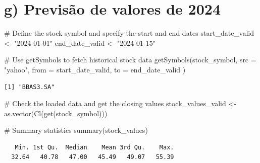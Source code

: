 \documentclass[
  letterpaper,
  DIV=11,
  numbers=noendperiod]{scrreprt}
\newenvironment{Shaded}{\begin{snugshade}}{\end{snugshade}}
\newcommand{\AttributeTok}[1]{\textcolor[rgb]{0.40,0.45,0.13}{#1}}
\newcommand{\CommentTok}[1]{\textcolor[rgb]{0.37,0.37,0.37}{#1}}
\newcommand{\FunctionTok}[1]{\textcolor[rgb]{0.28,0.35,0.67}{#1}}
\newcommand{\NormalTok}[1]{\textcolor[rgb]{0.00,0.23,0.31}{#1}}
\newcommand{\OtherTok}[1]{\textcolor[rgb]{0.00,0.23,0.31}{#1}}
\newcommand{\StringTok}[1]{\textcolor[rgb]{0.13,0.47,0.30}{#1}}
\begin{document}
\hypertarget{g-previsuxe3o-de-valores-de-2024}{%
\section*{g) Previsão de valores de
2024}\label{g-previsuxe3o-de-valores-de-2024}}


\begin{Shaded}
\begin{Highlighting}[]
\CommentTok{\# Define the stock symbol and specify the start and end dates}
\NormalTok{start\_date\_valid }\OtherTok{\textless{}{-}} \StringTok{"2024{-}01{-}01"}
\NormalTok{end\_date\_valid }\OtherTok{\textless{}{-}} \StringTok{"2024{-}01{-}15"}

\CommentTok{\# Use getSymbols to fetch historical stock data}
\FunctionTok{getSymbols}\NormalTok{(stock\_symbol,}
    \AttributeTok{src =} \StringTok{"yahoo"}\NormalTok{,}
    \AttributeTok{from =}\NormalTok{ start\_date\_valid,}
    \AttributeTok{to =}\NormalTok{ end\_date\_valid}
\NormalTok{)}
\end{Highlighting}
\end{Shaded}

\begin{verbatim}
[1] "BBAS3.SA"
\end{verbatim}

\begin{Shaded}
\begin{Highlighting}[]
\CommentTok{\# Check the loaded data and get the closing values}
\NormalTok{stock\_values\_valid }\OtherTok{\textless{}{-}} \FunctionTok{as.vector}\NormalTok{(}\FunctionTok{Cl}\NormalTok{(}\FunctionTok{get}\NormalTok{(stock\_symbol)))}

\CommentTok{\# Summary statistics}
\FunctionTok{summary}\NormalTok{(stock\_values)}
\end{Highlighting}
\end{Shaded}

\begin{verbatim}
   Min. 1st Qu.  Median    Mean 3rd Qu.    Max. 
  32.64   40.78   47.00   45.49   49.07   55.39 
\end{verbatim}
\end{document}
